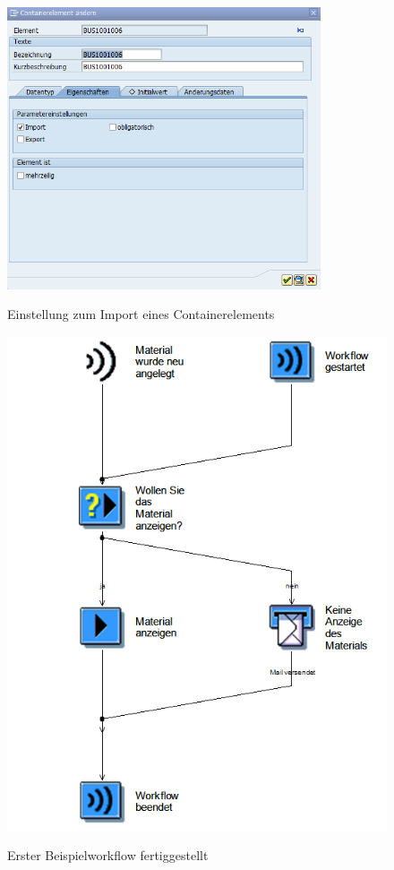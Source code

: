 \begin{figure}[H]
	\begin{center}
	\includegraphics[width=350px]{grafiken/wf-builder_bsp1_formular-containerelement-edit.png}
	\caption{Einstellung zum Import eines Containerelements}
	\vspace{-10pt}
	\label{abb:workflow-bsp1-containeredit-import}
	\end{center}
\end{figure}

\begin{figure}[H]
	\begin{center}
	\includegraphics[height=0.7\textheight]{grafiken/wf-builder_bsp1_complete.png}
	\caption{Erster Beispielworkflow fertiggestellt}
	\vspace{-10pt}
	\label{abb:workflow-bsp1-complete}
	\end{center}
\end{figure}

